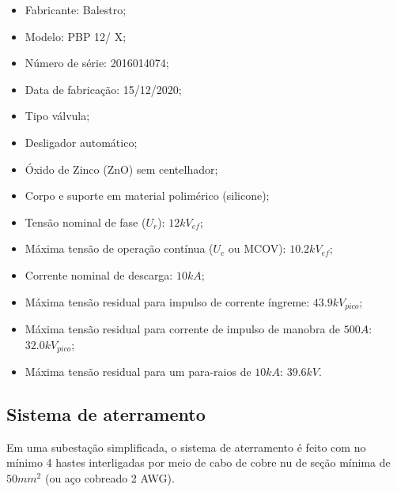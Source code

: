 \begin{itemize}
    \item Fabricante: Balestro;
    \item Modelo: PBP 12/ X;
    \item Número de série: 2016014074;
    \item Data de fabricação: 15/12/2020;
    \item Tipo válvula;
    \item Desligador automático;
    \item Óxido de Zinco (ZnO) sem centelhador;
    \item Corpo e suporte em material polimérico (silicone);
    \item Tensão nominal de fase ($U_r$): $12 kV_{ef}$;
    \item Máxima tensão de operação contínua ($U_c$ ou MCOV): $10.2 kV_{ef}$;
    \item Corrente nominal de descarga: $10 kA$;
    \item Máxima tensão residual para impulso de corrente íngreme: $43.9 kV_{pico}$;
    \item Máxima tensão residual para corrente de impulso de manobra de $500A$: $32.0 kV_{pico}$;
    \item Máxima tensão residual para um para-raios de $10 kA$: $39.6 kV$.
\end{itemize}


\subsection{Sistema de aterramento}

Em uma subestação simplificada, o sistema de aterramento é feito com no mínimo 4 hastes interligadas por meio de cabo de cobre nu de seção mínima de $50 mm^2$ (ou aço cobreado 2 AWG).

